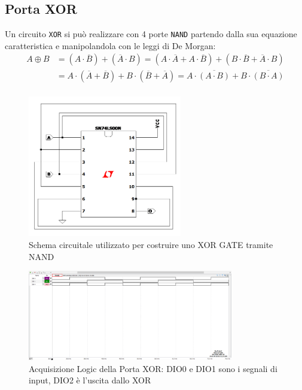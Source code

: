 \documentclass[10pt, a4paper, italian]{article}
\begin{document}
\subsection{Porta XOR}
Un circuito \texttt{XOR} si può realizzare con 4 porte \texttt{NAND} partendo
dalla sua equazione caratteristica e manipolandola con le leggi di De Morgan:
\begin{align*}
  A \oplus B &= (A \cdot \overline{B}) + (\overline{A} \cdot B)
             =  (A \cdot \overline{A} + A \cdot \overline{B}) + (B \cdot \overline{B} + \overline{A} \cdot B) \\
             &= A \cdot (\overline{A} + \overline{B}) + B \cdot (\overline{B} + \overline{A})
             = A \cdot \overline{(A \cdot B)} + B \cdot \overline{(B \cdot A)} \\
\end{align*}
\begin{figure}[htbp]
    \centering
    \includegraphics[width=0.6\textwidth]{NAND_XOR.png}
    \caption{\label{circuito3}Schema circuitale utilizzato per costruire uno XOR GATE tramite NAND}
    
\end{figure}

\begin{figure}[htbp]
    \centering
    \includegraphics[width=0.8\textwidth]{xor_time.png}
    \caption{\label{pat2}Acquisizione Logic della Porta XOR: DIO0 e DIO1 sono i segnali di input, DIO2 è l'uscita dallo XOR}
    
\end{figure}
\end{document}
